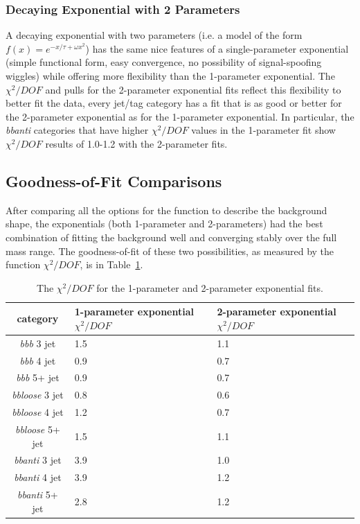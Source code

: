\subsubsection{Decaying Exponential with 2 Parameters}
A decaying exponential with two parameters (i.e. a model of the form  $f(x)=e^{-x/\tau+\omega x^2}$)
has the same nice features of a single-parameter exponential (simple functional
form, easy convergence, no possibility of signal-spoofing wiggles) while offering
more flexibility than the 1-parameter exponential.  The $\chi^2/DOF$ and pulls
for the 2-parameter exponential fits reflect this flexibility to better
fit the data, every jet/tag category has a fit that is as good or better
for the 2-parameter exponential as for the 1-parameter exponential.  In 
particular, the \textit{bbanti} categories that have higher $\chi^2/DOF$ values
in the 1-parameter fit show $\chi^2/DOF$ results of 1.0-1.2 with the 2-parameter fits. 

\subsection{Goodness-of-Fit Comparisons}
After comparing all the options for the function to describe the background
shape, the exponentials (both 1-parameter and 2-parameters) had the best
combination of fitting the background well and converging stably over the
full mass range.  The goodness-of-fit of these two possibilities, as measured
by the function $\chi^2/DOF$, is in Table~\ref{tab:chi2}.

\begin{table}
    \center
    \caption{The $\chi^2/DOF$ for the 1-parameter and 2-parameter exponential fits.
    \label{tab:chi2}}
    \begin{tabular}{ c p{3cm} p{3cm} } \hline \hline
        category & 1-parameter exponential $\chi^2/DOF$ & 2-parameter exponential $\chi^2/DOF$ \\ \hline
        \textit{bbb} 3 jet & 1.5 & 1.1 \\
        \textit{bbb} 4 jet & 0.9  & 0.7 \\
        \textit{bbb} 5+ jet & 0.9  & 0.7 \\
        \textit{bbloose} 3 jet & 0.8 & 0.6 \\
        \textit{bbloose} 4 jet & 1.2 & 0.7 \\
        \textit{bbloose} 5+ jet & 1.5 & 1.1 \\
        \textit{bbanti} 3 jet & 3.9 & 1.0 \\
        \textit{bbanti} 4 jet & 3.9 & 1.2 \\
        \textit{bbanti} 5+ jet & 2.8 & 1.2 \\
        \hline
    \end{tabular}
\end{table} 

